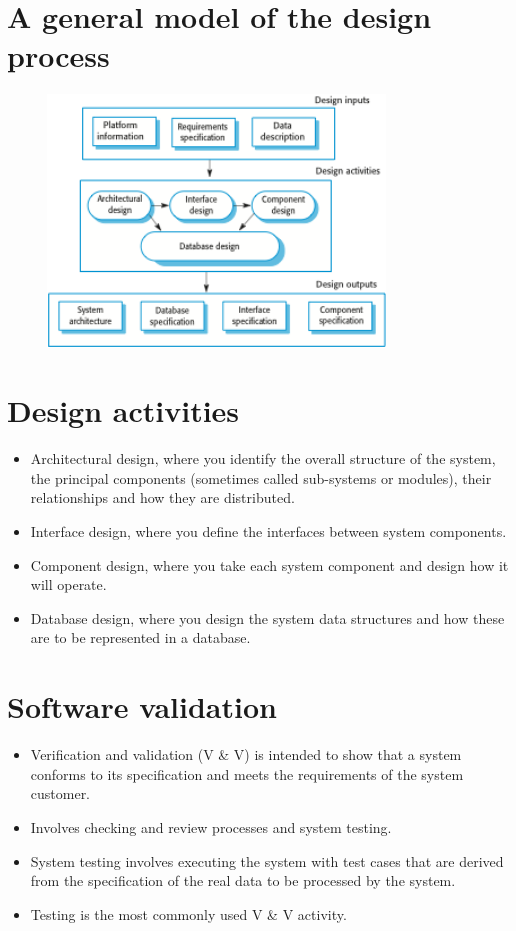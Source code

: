 \section{A general model of the design process}
\begin{figure}[h!]
    \centering
    \includegraphics[width = 0.8\textwidth]{./figures/designprocess_L1_5.png}
    \caption{}
    \label{fig:L1_5}
\end{figure}


\section{Design activities}
\begin{itemize}

\item Architectural design, where you identify the overall structure of the system, the principal components (sometimes called sub-systems or modules), their relationships and how they are distributed.

\item Interface design, where you define the interfaces between system components.

\item Component design, where you take each system component and design how it will operate.

\item Database design, where you design the system data structures and how these are to be represented in a database.
\end{itemize}

\section{Software validation}
\begin{itemize}
\item Verification and validation (V \& V) is intended to show that a system conforms to its specification and meets the requirements of the system customer.
\item Involves checking and review processes and system testing.
\item System testing involves executing the system with test cases that are derived from the specification of the real data to be processed by the system.
\item Testing is the most commonly used V \& V activity.
\end{itemize}



